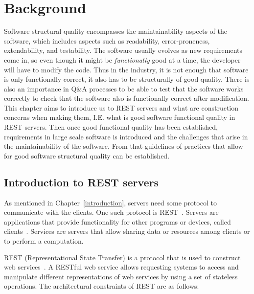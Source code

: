 \chapter{Background}\label{background}

Software structural quality encompasses the maintainability aspects of the
software, which includes aspects such as readability, error-proneness,
extendability, and testability. The software usually evolves as new
requirements come in, so even though it might be \textit{functionally} good at
a time, the developer will have to modify the code. Thus in the industry, it is
not enough that software is only functionally correct, it also has to be
structurally of good quality. There is also an importance in Q\&A processes to
be able to test that the software works correctly to check that the software
also is functionally correct after modification. This chapter aims to introduce
us to REST servers and what are construction concerns when making them, I.E.
what is good software functional quality in REST servers. Then once good
functional quality has been established, requirements in large scale software
is introduced and the challenges that arise in the maintainability of the
software. From that guidelines of practices that allow for good software
structural quality can be established.

\section{Introduction to REST servers}

As mentioned in Chapter~\ref{introduction}, servers need some protocol to
communicate with the clients. One such protocol is
REST~\cite{Fielding:2000:ASD:932295}. Servers are applications that provide
functionality for other programs or devices, called
clients~\cite{Fielding:2000:ASD:932295}. Services are servers that allow sharing
data or resources among clients or to perform a computation.

REST (Representational State Transfer) is a protocol that is used to construct
web services~\cite{Fielding:2000:ASD:932295}. A RESTful web service allows
requesting systems to access and manipulate different representations of web
services by using a set of stateless operations. The architectural constraints
of REST are as follows:

